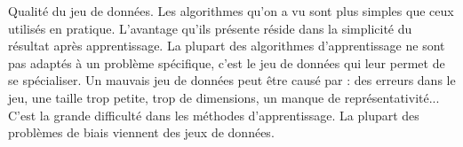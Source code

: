 \documentclass[french, 11pt]{article}
\begin{document}
\begin{defi}{Qualité du jeu de données.}{}
    Les algorithmes qu'on a vu sont plus simples que ceux utilisés en pratique. L'avantage qu'ils présente réside dans la simplicité du résultat après apprentissage. La plupart des algorithmes d'apprentissage ne sont pas adaptés à un problème spécifique, c'est le jeu de données qui leur permet de se spécialiser.
    Un mauvais jeu de données peut être causé par : des erreurs dans le jeu, une taille trop petite, trop de dimensions, un manque de représentativité...\\
    C'est la grande difficulté dans les méthodes d'apprentissage. La plupart des problèmes de biais viennent des jeux de données.
\end{defi}
\end{document}
